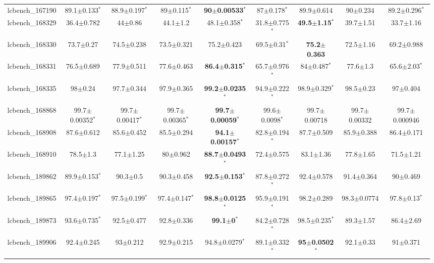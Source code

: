 \begin{table}[t]
\begin{center}
\begin{tabular}{lcccccccc}
lcbench\_167190 & 89.1$\pm$0.133$^{*}$ & 88.9$\pm$0.197$^{*}$ & 89$\pm$0.115$^{*}$ & \textbf{90$\pm$0.00533}$^{*}$ & 87$\pm$0.178$^{*}$ & 89.9$\pm$0.614 & 90$\pm$0.234 & 89.2$\pm$0.296$^{*}$ \\
lcbench\_168329 & 36.4$\pm$0.782 & 44$\pm$0.86 & 44.1$\pm$1.2 & 48.1$\pm$0.358$^{*}$ & 31.8$\pm$0.775$^{*}$ & \textbf{49.5$\pm$1.15}$^{*}$ & 39.7$\pm$1.51 & 33.7$\pm$1.16 \\
lcbench\_168330 & 73.7$\pm$0.27 & 74.5$\pm$0.238 & 73.5$\pm$0.321 & 75.2$\pm$0.423 & 69.5$\pm$0.31$^{*}$ & \textbf{75.2$\pm$0.363} & 72.5$\pm$1.16 & 69.2$\pm$0.988 \\
lcbench\_168331 & 76.5$\pm$0.689 & 77.9$\pm$0.511 & 77.6$\pm$0.463 & \textbf{86.4$\pm$0.315}$^{*}$ & 65.7$\pm$0.976$^{*}$ & 84$\pm$0.487$^{*}$ & 77.6$\pm$1.3 & 65.6$\pm$2.03$^{*}$ \\
lcbench\_168335 & 98$\pm$0.24 & 97.7$\pm$0.344 & 97.9$\pm$0.365 & \textbf{99.2$\pm$0.0235}$^{*}$ & 94.9$\pm$0.222$^{*}$ & 98.9$\pm$0.329$^{*}$ & 98.5$\pm$0.23 & 97$\pm$0.404 \\
lcbench\_168868 & 99.7$\pm$0.00352$^{*}$ & 99.7$\pm$0.00417$^{*}$ & 99.7$\pm$0.00365$^{*}$ & \textbf{99.7$\pm$0.00059}$^{*}$ & 99.6$\pm$0.0098$^{*}$ & 99.7$\pm$0.00718 & 99.7$\pm$0.00332 & 99.7$\pm$0.000946 \\
lcbench\_168908 & 87.6$\pm$0.612 & 85.6$\pm$0.452 & 85.5$\pm$0.294 & \textbf{94.1$\pm$0.00157}$^{*}$ & 82.8$\pm$0.194$^{*}$ & 87.7$\pm$0.509 & 85.9$\pm$0.388 & 86.4$\pm$0.171 \\
lcbench\_168910 & 78.5$\pm$1.3 & 77.1$\pm$1.25 & 80$\pm$0.962 & \textbf{88.7$\pm$0.0493}$^{*}$ & 72.4$\pm$0.575 & 83.1$\pm$1.36 & 77.8$\pm$1.65 & 71.5$\pm$1.21 \\
lcbench\_189862 & 89.9$\pm$0.153$^{*}$ & 90.3$\pm$0.5 & 90.3$\pm$0.458 & \textbf{92.5$\pm$0.153}$^{*}$ & 87.8$\pm$0.272$^{*}$ & 92.4$\pm$0.578 & 91.4$\pm$0.364 & 90$\pm$0.469 \\
lcbench\_189865 & 97.4$\pm$0.197$^{*}$ & 97.5$\pm$0.199$^{*}$ & 97.4$\pm$0.147$^{*}$ & \textbf{98.8$\pm$0.0125}$^{*}$ & 95.9$\pm$0.191$^{*}$ & 98.2$\pm$0.289 & 98.3$\pm$0.0774 & 97.8$\pm$0.13$^{*}$ \\
lcbench\_189873 & 93.6$\pm$0.735$^{*}$ & 92.5$\pm$0.477 & 92.8$\pm$0.336 & \textbf{99.1$\pm$0}$^{*}$ & 84.2$\pm$0.728$^{*}$ & 98.5$\pm$0.235$^{*}$ & 89.3$\pm$1.57 & 86.4$\pm$2.69 \\
lcbench\_189906 & 92.4$\pm$0.245 & 93$\pm$0.212 & 92.9$\pm$0.215 & 94.8$\pm$0.0279$^{*}$ & 89.1$\pm$0.332$^{*}$ & \textbf{95$\pm$0.0502}$^{*}$ & 92.1$\pm$0.33 & 91$\pm$0.371 \\

\end{tabular}
\end{center}
\end{table}
